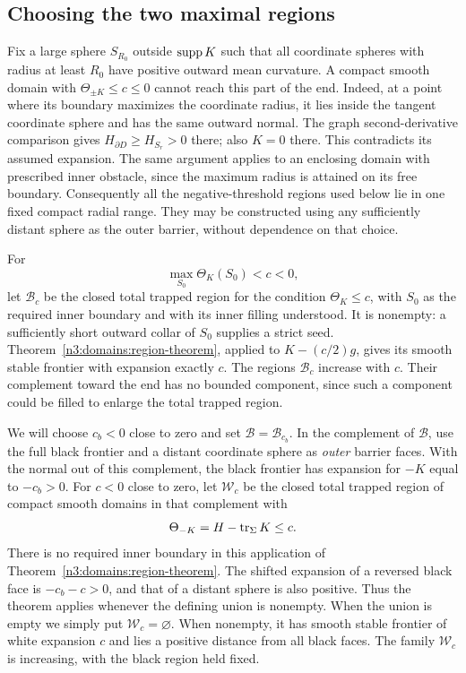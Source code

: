 \subsection{Choosing the two maximal regions}

Fix a large sphere $S_{R_0}$ outside $\operatorname{supp} K$ such that all coordinate
spheres with radius at least $R_0$ have positive outward mean
curvature.  A compact smooth domain with $\Theta_{\pm K}\leq c\leq0$
cannot reach this part of the end.  Indeed, at a point where its
boundary maximizes the coordinate radius, it lies inside the tangent
coordinate sphere and has the same outward normal.  The graph
second-derivative comparison gives
$H_{\partial D}\geq H_{S_r}>0$ there; also $K=0$ there.  This
contradicts its assumed expansion.  The same argument applies to an
enclosing domain with prescribed inner obstacle, since the maximum
radius is attained on its free boundary.  Consequently all the
negative-threshold regions used below lie in one fixed compact radial
range.  They may be constructed using any sufficiently distant
sphere as the outer barrier, without dependence on that choice.

For
\begin{equation}\label{n3:domains:black-interval}
 \max_{S_0}\Theta_K(S_0)<c<0,
\end{equation}
let $\mathcal B_c$ be the closed total trapped region for the
condition $\Theta_K\leq c$, with $S_0$ as the required inner
boundary and with its inner filling understood.  It is nonempty:
a sufficiently short outward collar of $S_0$ supplies a strict seed.
Theorem~\ref{n3:domains:region-theorem}, applied to $K-(c/2)g$, gives
its smooth stable frontier with expansion exactly $c$.  The regions
$\mathcal B_c$ increase with $c$.  Their complement toward the end
has no bounded component, since such a component could be filled to
enlarge the total trapped region.

We will choose $c_b<0$ close to zero and set
$\mathcal B=\mathcal B_{c_b}$.  In the complement of $\mathcal B$,
use the full black frontier and a distant coordinate sphere as
\emph{outer} barrier faces.  With the normal out of this complement,
the black frontier has expansion for $-K$ equal to $-c_b>0$.
For $c<0$ close to zero, let $\mathcal W_c$ be the closed total
trapped region of compact smooth domains in that complement with
\begin{equation}\label{n3:domains:white-condition}
 \Theta_{-K}=H-\operatorname{tr}_\Sigma K\leq c.
\end{equation}
There is no required inner boundary in this application of
Theorem~\ref{n3:domains:region-theorem}.  The shifted expansion of a
reversed black face is $-c_b-c>0$, and that of a distant sphere is
also positive.  Thus the theorem applies whenever the defining union
is nonempty.  When the union is empty we simply put
$\mathcal W_c=\varnothing$.  When nonempty, it has smooth stable
frontier of white expansion $c$ and lies a positive distance from all
black faces.  The family $\mathcal W_c$ is increasing, with the black
region held fixed.

